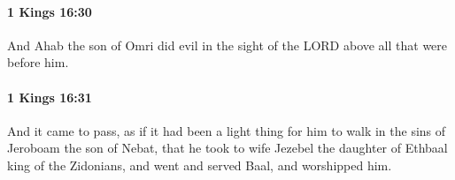 		\paragraph{1 Kings 16:30} %
			\label{1KINGS-16-30}

			And Ahab the son of Omri did evil in the sight of the LORD above all that were before him.


		\paragraph{1 Kings 16:31} %
			\label{1KINGS-16-31}

			And it came to pass, as if it had been a light thing for him to walk in the sins of Jeroboam the son of Nebat, that he took to wife Jezebel the daughter of Ethbaal king of the Zidonians, and went and served Baal, and worshipped him.


